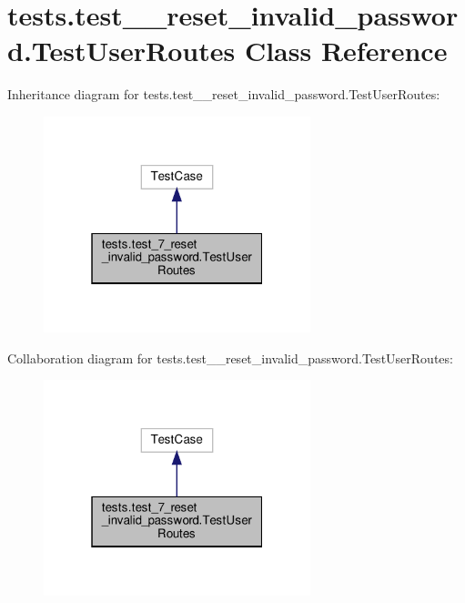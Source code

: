 \hypertarget{classtests_1_1test__7__reset__invalid__password_1_1_test_user_routes}{}\section{tests.\+test\+\_\+\_\+reset\+\_\+invalid\+\_\+password.\+Test\+User\+Routes Class Reference}
\label{classtests_1_1test__7__reset__invalid__password_1_1_test_user_routes}


Inheritance diagram for tests.\+test\+\_\+\_\+reset\+\_\+invalid\+\_\+password.\+Test\+User\+Routes\+:
\nopagebreak
\begin{figure}[H]
\begin{center}
\leavevmode
\includegraphics[width=220pt]{classtests_1_1test__7__reset__invalid__password_1_1_test_user_routes__inherit__graph}
\end{center}
\end{figure}


Collaboration diagram for tests.\+test\+\_\+\_\+reset\+\_\+invalid\+\_\+password.\+Test\+User\+Routes\+:
\nopagebreak
\begin{figure}[H]
\begin{center}
\leavevmode
\includegraphics[width=220pt]{classtests_1_1test__7__reset__invalid__password_1_1_test_user_routes__coll__graph}
\end{center}
\end{figure}
